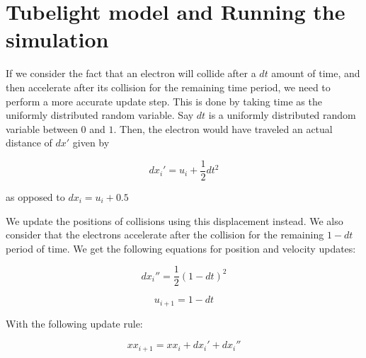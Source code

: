 \documentclass[11pt, a4paper, twoside]{article}
\begin{document}
\section*{Tubelight model and Running the simulation}

If we consider the fact that an electron will collide after a
\(dt\) amount of time, and then accelerate after its collision for the
remaining time period, we need to perform a more accurate update step.
This is done by taking time as the uniformly distributed random
variable. Say \(dt\) is a uniformly distributed random variable between
\(0\) and \(1\). Then, the electron would have traveled an actual
distance of \(dx'\) given by

\[dx_i' = u_i + \frac{1}{2}dt^2\]

as opposed to \(dx_i = u_i + 0.5\)

We update the positions of collisions using this displacement instead.
We also consider that the electrons accelerate after the collision for
the remaining \(1-dt\) period of time. We get the following equations
for position and velocity updates:

\[dx_i'' = \frac{1}{2}(1-dt)^2\]

\[u_{i+1} = 1-dt\]

With the following update rule:

\[xx_{i+1} = xx_i + dx_i' + dx_i''\]
\end{document}
